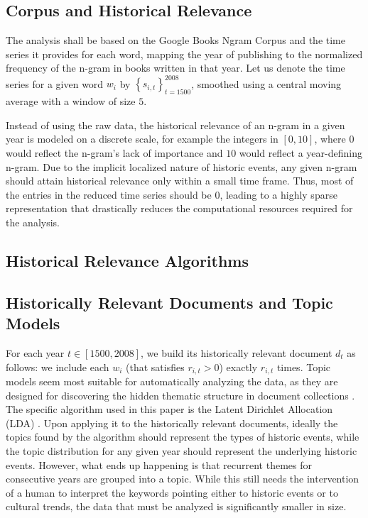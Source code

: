 
\subsection{Corpus and Historical Relevance}

The analysis shall be based on the Google Books Ngram Corpus and the time series it provides for each word, mapping the year of publishing to the normalized frequency of the n-gram in books written in that year. Let us denote the time series for a given word $w_i$ by $\left\{ s_{i, t} \right\}_{t = 1500}^{2008}$, smoothed using a central moving average with a window of size $5$.

Instead of using the raw data, the historical relevance of an n-gram in a given year is modeled on a discrete scale, for example the integers in $\left[ 0, 10 \right]$, where $0$ would reflect the n-gram's lack of importance and $10$ would reflect a year-defining n-gram. Due to the implicit localized nature of historic events, any given n-gram should attain historical relevance only within a small time frame. Thus, most of the entries in the reduced time series should be $0$, leading to a highly sparse representation that drastically reduces the computational resources required for the analysis.

\subsection{Historical Relevance Algorithms}
\label{sec:historical-relevance-algorithms}


\subsection{Historically Relevant Documents and Topic Models}

For each year $t \in \left[ 1500, 2008 \right]$, we build its historically relevant document $d_t$ as follows: we include each $w_i$ (that satisfies $r_{i, t} > 0$) exactly $r_{i, t}$ times. Topic models seem most suitable for automatically analyzing the data, as they are designed for discovering the hidden thematic structure in document collections . The specific algorithm used in this paper is the Latent Dirichlet Allocation (LDA) . Upon applying it to the historically relevant documents, ideally the topics found by the algorithm should represent the types of historic events, while the topic distribution for any given year should represent the underlying historic events. However, what ends up happening is that recurrent themes for consecutive years are grouped into a topic. While this still needs the intervention of a human to interpret the keywords pointing either to historic events or to cultural trends, the data that must be analyzed is significantly smaller in size.

